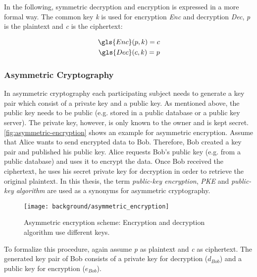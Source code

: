 In the following, symmetric decryption and encryption is expressed in a more formal way. The common key \textit{k} is used for encryption \textit{\gls{Enc}} and decryption \textit{\gls{Dec}}, \textit{p} is the plaintext and \textit{c} is the ciphertext:

\begin{align*}
\gls{Enc}(p, k) = c\\
\gls{Dec}(c, k) = p
\end{align*}

\subsubsection{Asymmetric Cryptography}

In asymmetric cryptography each participating subject needs to generate a key pair which consist of a private key and a public key. As mentioned above, the public key needs to be public (e.g. stored in a public database or a public key server). The private key, however, is only known to the owner and is kept secret.
\autoref{fig:asymmetric-encryption} shows an example for asymmetric encryption. Assume that Alice wants to send encrypted data to Bob. Therefore, Bob created a key pair and published his public key. Alice requests Bob's public key (e.g. from a public database) and uses it to encrypt the data. Once Bob received the ciphertext, he uses his secret private key for decryption in order to retrieve the original  plaintext. In this thesis, the term \textit{public-key encryption}, \textit{PKE} and \textit{public-key algorithm} are used as a synonyms for asymmetric cryptography.

\begin{figure}[htpb]
  \centering
  \texttt{[image: background/asymmetric\_encryption]}
  \caption[Asymmetric encryption scheme]{Asymmetric encryption scheme: Encryption and decryption algorithm use different keys.} \label{fig:asymmetric-encryption}
\end{figure}

To formalize this procedure, again assume \textit{p} as plaintext and \textit{c} as ciphertext. The generated key pair of Bob consists of a private key for decryption ($d_{Bob}$) and a public key for encryption ($e_{Bob}$).

